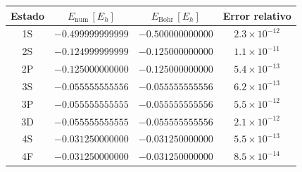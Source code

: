 \begin{tabular}{cccc}
\toprule
Estado & $E_\mathrm{num}\,[E_h]$ & $E_\mathrm{Bohr}\,[E_h]$ & Error relativo \\
\midrule
1S & $-0.499999999999$ & $-0.500000000000$ & $2.3\times10^{-12}$ \\
2S & $-0.124999999999$ & $-0.125000000000$ & $1.1\times10^{-11}$ \\
2P & $-0.125000000000$ & $-0.125000000000$ & $5.4\times10^{-13}$ \\
3S & $-0.055555555556$ & $-0.055555555556$ & $6.2\times10^{-13}$ \\
3P & $-0.055555555555$ & $-0.055555555556$ & $5.5\times10^{-12}$ \\
3D & $-0.055555555555$ & $-0.055555555556$ & $2.1\times10^{-12}$ \\
4S & $-0.031250000000$ & $-0.031250000000$ & $5.5\times10^{-13}$ \\
4F & $-0.031250000000$ & $-0.031250000000$ & $8.5\times10^{-14}$ \\
\bottomrule
\end{tabular}
